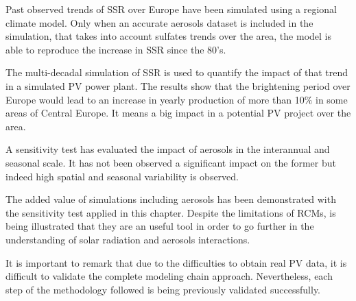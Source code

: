 Past observed trends of SSR over Europe have been simulated using a regional climate model. Only when an accurate aerosols dataset is included in the simulation, that takes into account sulfates trends over the area, the model is able to reproduce the increase in SSR since the 80's.

The multi-decadal simulation of SSR is used to quantify the impact of that trend in a simulated PV power plant. The results show that the brightening period over Europe would lead to an increase in yearly production of more than 10$\%$ in some areas of Central Europe. It means a big impact in a potential PV project over the area.

A sensitivity test has evaluated the impact of aerosols in the interannual and seasonal scale. It has not been observed a significant impact on the former but indeed high spatial and seasonal variability is observed.


The added value of simulations including aerosols has been demonstrated with the sensitivity test applied in this chapter. Despite the limitations of RCMs, is being illustrated that they are an useful tool in order to go further in the understanding of solar radiation and aerosols interactions.


It is important to remark that due to the difficulties to obtain real PV data, it is difficult to validate the complete modeling chain approach. Nevertheless, each step of the methodology followed is being previously validated successfully.

